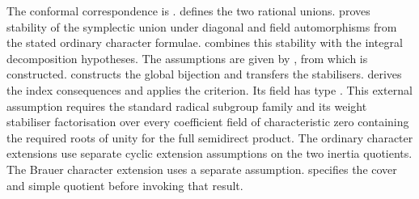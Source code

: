 \begin{implementation}
The conformal correspondence is
.
 defines the two rational
unions. 
proves stability of the symplectic union under diagonal and field
automorphisms from the stated ordinary character formulae.
combines this stability with the integral decomposition hypotheses.
The assumptions are given by
, from which
 is constructed.
 constructs
the global bijection and transfers the stabilisers.
 derives the index
consequences and applies the criterion. Its field
 has type
. This
external assumption requires the standard radical subgroup family and
its weight stabiliser factorisation over every coefficient field of
characteristic zero containing the required roots of unity for the full
semidirect product.
The ordinary character extensions use separate cyclic extension
assumptions on the two inertia quotients. The Brauer character extension
uses a separate assumption.
 specifies the
cover and simple quotient before invoking that result.
\end{implementation}
